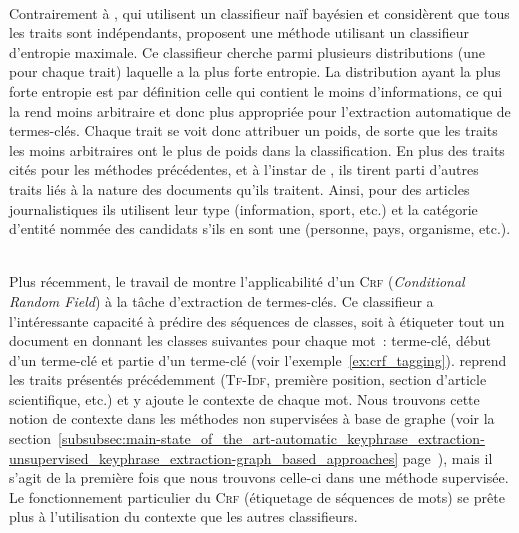         ~\\Contrairement à , qui utilisent un classifieur
        naïf bayésien et considèrent que tous les traits sont indépendants,
         proposent une méthode utilisant un
        classifieur d'entropie maximale. Ce classifieur cherche parmi plusieurs
        distributions (une pour chaque trait) laquelle a la plus forte entropie.
        La distribution ayant la plus forte entropie est par définition celle
        qui contient le moins d'informations, ce qui la rend moins arbitraire et
        donc plus appropriée pour l'extraction automatique de termes-clés.
        Chaque trait se voit donc attribuer un poids, de sorte que les traits
        les moins arbitraires ont le plus de poids dans la classification. En
        plus des traits cités pour les méthodes précédentes, et à l'instar de
        , ils tirent parti d'autres
        traits liés à la nature des documents qu'ils traitent. Ainsi, pour des
        articles journalistiques ils utilisent leur type (information, sport,
        etc.) et la catégorie d'entité nommée des candidats s'ils en sont une
        (personne, pays, organisme, etc.).

        ~\\Plus récemment, le travail de 
        montre l'applicabilité d'un \textsc{Crf} (\textit{Conditional Random
        Field}) à la tâche d'extraction de termes-clés. Ce classifieur a
        l'intéressante capacité à prédire des séquences de classes, soit à
        étiqueter tout un document en donnant les classes suivantes pour chaque
        mot~: \og{}terme-clé\fg{}, \og{}début d'un terme-clé\fg{} et \og{}partie
        d'un terme-clé\fg{} (voir l'exemple~\ref{ex:crf_tagging}). 
        reprend les traits présentés précédemment (\textsc{Tf-Idf}, première position,
        section d'article scientifique, etc.) et y ajoute le contexte de
        chaque mot. Nous trouvons cette notion de contexte dans les méthodes non
        supervisées à base de graphe (voir la
        section~\ref{subsubsec:main-state_of_the_art-automatic_keyphrase_extraction-unsupervised_keyphrase_extraction-graph_based_approaches}
        page~\pageref{subsubsec:main-state_of_the_art-automatic_keyphrase_extraction-unsupervised_keyphrase_extraction-graph_based_approaches}),
        mais il s'agit de la première fois que nous trouvons celle-ci dans une
        méthode supervisée. Le fonctionnement particulier du \textsc{Crf}
        (étiquetage de séquences de mots) se
        prête plus à l'utilisation du contexte que les autres classifieurs.

